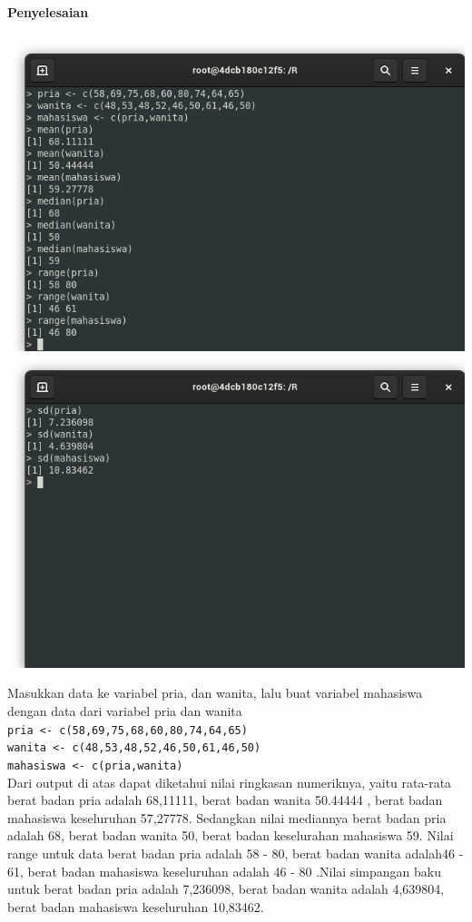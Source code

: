 \documentclass[a4paper,12pt]{article}
\begin{document}
\paragraph{Penyelesaian}
\begin{center}
\includegraphics[scale=.6]{latihan02-1}
\includegraphics[scale=.6]{latihan02-2}
\end{center}
Masukkan data ke variabel pria, dan wanita, lalu buat variabel mahasiswa dengan data dari variabel pria dan wanita\\
\texttt{pria <- c(58,69,75,68,60,80,74,64,65)\\
wanita <- c(48,53,48,52,46,50,61,46,50)\\
mahasiswa <- c(pria,wanita)\\}
Dari output di atas dapat diketahui nilai ringkasan numeriknya, yaitu rata-rata berat badan pria adalah 68,11111, berat badan wanita 50.44444 , berat badan mahasiswa keseluruhan 57,27778. Sedangkan nilai mediannya berat badan pria adalah 68,  berat badan wanita 50, berat badan keselurahan mahasiswa 59. Nilai range untuk data berat badan pria adalah 58 - 80, berat badan wanita adalah46 - 61, berat badan mahasiswa keseluruhan adalah 46 - 80 .Nilai simpangan baku untuk berat badan pria adalah 7,236098, berat badan wanita adalah 4,639804, berat badan mahasiswa keseluruhan 10,83462.\\
\end{document}
